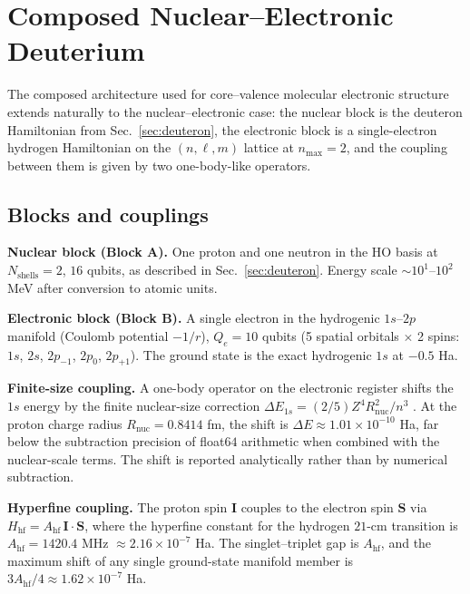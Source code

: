 \documentclass[twocolumn,prc,amsmath,amssymb,superscriptaddress]{revtex4-2}
\begin{document}
\section{Composed Nuclear--Electronic Deuterium}
\label{sec:ne}

The composed architecture used for core--valence molecular electronic
structure~\cite{Paper14,Paper17} extends naturally to the
nuclear--electronic case: the nuclear block is the deuteron
Hamiltonian from Sec.~\ref{sec:deuteron}, the electronic block is a
single-electron hydrogen Hamiltonian on the $(n, \ell, m)$ lattice at
$n_{\max}=2$, and the coupling between them is given by two
one-body-like operators.

\subsection{Blocks and couplings}

\textbf{Nuclear block (Block A).} One proton and one neutron in the
HO basis at $N_{\mathrm{shells}}=2$, $16$ qubits, as described in
Sec.~\ref{sec:deuteron}. Energy scale $\sim 10^1$--$10^2$ MeV after
conversion to atomic units.

\textbf{Electronic block (Block B).} A single electron in the
hydrogenic $1s$--$2p$ manifold (Coulomb potential $-1/r$), $Q_e = 10$
qubits (5 spatial orbitals $\times$ 2 spins: $1s$, $2s$, $2p_{-1}$,
$2p_0$, $2p_{+1}$). The ground state is the exact hydrogenic $1s$ at
$-0.5$ Ha.

\textbf{Finite-size coupling.} A one-body operator on the electronic
register shifts the $1s$ energy by the finite nuclear-size correction
$\Delta E_{1s} = (2/5) Z^4 R_{\mathrm{nuc}}^2 / n^3$
\cite{Foldy1958,Friar1979}. At the proton charge radius
$R_{\mathrm{nuc}} = 0.8414$ fm, the shift is
$\Delta E \approx 1.01 \times 10^{-10}$ Ha, far below the subtraction
precision of float$64$ arithmetic when combined with the nuclear-scale
terms. The shift is reported analytically rather than by numerical
subtraction.

\textbf{Hyperfine coupling.} The proton spin $\mathbf{I}$ couples to
the electron spin $\mathbf{S}$ via
$H_{\mathrm{hf}} = A_{\mathrm{hf}} \, \mathbf{I}\cdot\mathbf{S}$, where
the hyperfine constant for the hydrogen $21$-cm transition is
$A_{\mathrm{hf}} = 1420.4$ MHz $\approx 2.16 \times 10^{-7}$ Ha. The
singlet--triplet gap is $A_{\mathrm{hf}}$, and the maximum shift of
any single ground-state manifold member is $3 A_{\mathrm{hf}}/4
\approx 1.62 \times 10^{-7}$ Ha.
\end{document}

